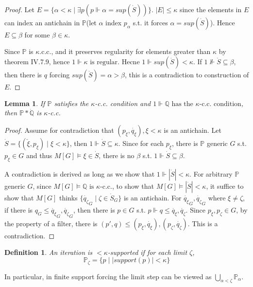 \documentclass{article}
\newtheorem{definition}{Definition}
\newtheorem{lemma}{Lemma}
\newcommand{\bbP}{\mathbb{P}}
\newcommand{\bbQ}{\mathbb{Q}}
\begin{document}
\begin{proof}
    Let $E  = \{\alpha<\kappa\mid \exists p(p\Vdash \alpha = sup(\dot{S})) \}$. $|E|\leq \kappa$ since the elements in $E$ can index an antichain in $\bbP$(let $\alpha$ index $p_\alpha$ s.t. it forces $\alpha = sup(\dot{S})$). Hence $E\subseteq \beta$ for some $\beta\in \kappa$.

    Since $\mathbb{P}$ is $\kappa$.c.c., and it preserves regularity for elements greater than $\kappa$ by theorem IV.7.9, hence $1\Vdash \kappa\text{ is regular}$. Hecne $1\Vdash sup(\dot{S})<\kappa$. If $1\not\Vdash \dot{S}\subseteq \beta$, then there is $q$ forcing $sup(\dot{S}) = \alpha > \beta$, this is a contradiction to construction of $E$.
\end{proof}

\begin{lemma}\label{lem:5}
    If $\bbP$ satisfies the $\kappa$-c.c. condition and $1\Vdash \bbQ \text{ has the $\kappa$-c.c. condition}$, then $\bbP*\dot{\bbQ}$ is $\kappa$-c.c.
\end{lemma}

\begin{proof}
    Assume for contradiction that $(p_\xi,\dot{q_\xi}), \xi<\kappa$ is an antichain. Let $\dot{S} = \{(\check{\xi},p_\xi)\mid \xi<\kappa\}$, then $1\Vdash \dot{S}\subseteq \kappa$. Since for each $p_\xi$, there is $\bbP$ generic $G$ s.t. $p_\xi\in G$ and thus $M[G]\models \xi\in \dot{S}$, there is no $\beta$ s.t. $1\Vdash \dot{S}\subseteq \beta$.

    A contradiction is derived as long as we show that $1\Vdash |\dot{S}|<\kappa$. For arbitrary $\bbP$ generic $G$, since $M[G]\models \bbQ\text{ is $\kappa$-c.c.}$, to show that $M[G]\models |\dot{S}|<\kappa$, it suffice to show that $M[G]$ thinks $\{\dot{q_\zeta}_G\mid \zeta\in \dot{S}_G\}$ is an antichain. For $\dot{q_\xi}_G,\dot{q_\zeta}_G$ where $\xi\neq \zeta$, if there is $q_G\leq \dot{q_\xi}_G,\dot{q_\zeta}_G$, then there is $p\in G$ s.t. $p\Vdash q\leq \dot{q_\xi},\dot{q_\zeta}$. Since $p_\xi,p_\zeta\in G$, by the property of a filter, there is $(p',q)\leq (p_\xi,\dot{q_\xi}), (p_\zeta, \dot{q_\zeta})$. This is a contradiction.
\end{proof}

\begin{definition}
    An iteration is $<\kappa$-supported if for each limit $\zeta$, $$\bbP_\zeta = \{p\mid |support(p)|<\kappa\}$$
\end{definition}

In particular, in finite support forcing the limit step can be viewed as $\bigcup_{\alpha<\zeta}\bbP_\alpha$.
\end{document}
